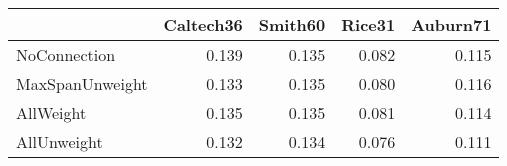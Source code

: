 \begin{tabular}{lrrrr}
\toprule
{} & Caltech36 & Smith60 & Rice31 & Auburn71 \\
\midrule
NoConnection    &     0.139 &   0.135 &  0.082 &    0.115 \\
MaxSpanUnweight &     0.133 &   0.135 &  0.080 &    0.116 \\
AllWeight       &     0.135 &   0.135 &  0.081 &    0.114 \\
AllUnweight     &     0.132 &   0.134 &  0.076 &    0.111 \\
\bottomrule
\end{tabular}
